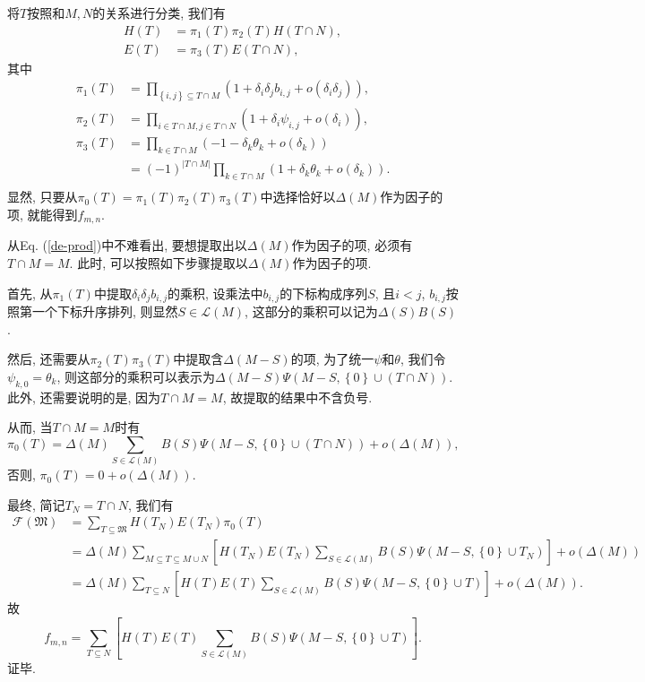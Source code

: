 \documentclass[12pt,a4paper,UTF8]{article}
\numberwithin{equation}{section}
\newcommand{\sbrace}[1]{\left(#1\right)}
\newcommand{\mbrace}[1]{\left[#1\right]}
\newcommand{\bbrace}[1]{\left\{#1\right\}}
\newcommand{\FM}{\mathfrak{M}}
\newcommand{\CF}{\mathcal{F}}
\newcommand{\refeqn}[1]{Eq. (\ref{#1})}
\begin{document}
将$T$按照和$M,N$的关系进行分类, 我们有
\begin{equation}
\begin{aligned}
  H(T)&=\pi_1(T)\pi_2(T)H(T\cap N), \\ 
  E(T)&=\pi_3(T)E(T\cap N),
\end{aligned}
\end{equation}
其中
\begin{equation}
\begin{aligned}
  \pi_1(T)&=\prod_{\bbrace{i,j}\subseteq T\cap M}\sbrace{1+\delta_i \delta_j b_{i,j}+o(\delta_i \delta_j)} ,\\
  \pi_2(T)&=\prod_{i\in T\cap M,j\in T\cap N}\sbrace{1+\delta_i \psi_{i,j}+o(\delta_i)} ,\\
  \pi_3(T)&=\prod_{k\in T\cap M}\sbrace{-1-\delta_k \theta_k+o(\delta_k)} \\
  &=(-1)^{|T\cap M|}\prod_{k\in T\cap M}\sbrace{1+\delta_k \theta_k+o(\delta_k)}.\\
\end{aligned}
\label{de-prod}
\end{equation}
显然, 只要从$\pi_0(T)=\pi_1(T)\pi_2(T)\pi_3(T)$中选择恰好以$\Delta(M)$作为因子的项, 就能得到$f_{m,n}$. 

从\refeqn{de-prod}中不难看出, 要想提取出以$\Delta(M)$作为因子的项, 必须有$T\cap M=M$. 此时, 可以按照如下步骤提取以$\Delta(M)$作为因子的项.

首先, 从$\pi_1(T)$中提取$\delta_i \delta_j b_{i,j}$的乘积, 设乘法中$b_{i,j}$的下标构成序列$S$, 且$i<j$, $b_{i,j}$按照第一个下标升序排列, 则显然$S\in \mathcal L(M)$, 这部分的乘积可以记为$\Delta(S)B(S)$. 

然后, 还需要从$\pi_2(T)\pi_3(T)$中提取含$\Delta(M-S)$的项, 为了统一$\psi$和$\theta$, 我们令$\psi_{k,0}=\theta_k$, 则这部分的乘积可以表示为$\Delta(M-S)\Psi(M-S,\bbrace{0}\cup (T\cap N))$. 此外, 还需要说明的是, 因为$T\cap M=M$, 故提取的结果中不含负号. 

从而, 当$T\cap M=M$时有
\begin{equation}
  \pi_0(T)=\Delta(M)\sum_{S\in \mathcal L(M)}{B(S)\Psi(M-S,\bbrace{0}\cup (T\cap N))}+o(\Delta(M)),
\end{equation}
否则, $\pi_0(T)=0+o(\Delta(M))$.

最终, 简记$T_N=T\cap N$, 我们有
\begin{equation}
\begin{aligned}
\CF(\FM)&=\sum_{T\subseteq \FM}{H(T_N)E(T_N)\pi_0(T)} \\ 
&=\Delta(M)\sum_{M\subseteq T\subseteq M\cup N}\mbrace{H(T_N)E(T_N)\sum_{S\in \mathcal L(M)}{B(S)\Psi(M-S,\bbrace{0}\cup T_N)}}+o(\Delta(M)) \\
&=\Delta(M)\sum_{T\subseteq N}\mbrace{H(T)E(T)\sum_{S\in \mathcal L(M)}{B(S)\Psi(M-S,\bbrace{0}\cup T)}}+o(\Delta(M)) .
\end{aligned}
\end{equation}
故
\begin{equation}
f_{m,n}=\sum_{T\subseteq N}\mbrace{H(T)E(T)\sum_{S\in \mathcal L(M)}{B(S)\Psi(M-S,\bbrace{0}\cup T)}}. 
\end{equation}
证毕. 
\end{document}
